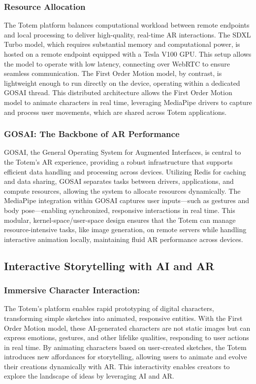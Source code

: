 \subsubsection{Resource Allocation}
The Totem platform balances computational workload between remote endpoints and local processing to deliver high-quality, real-time AR interactions.
The SDXL Turbo model, which requires substantial memory and computational power, is hosted on a remote endpoint equipped with a Tesla V100 GPU.
This setup allows the model to operate with low latency, connecting over WebRTC to ensure seamless communication.
The First Order Motion model, by contrast, is lightweight enough to run directly on the device, operating within a dedicated GOSAI thread.
This distributed architecture allows the First Order Motion model to animate characters in real time, leveraging MediaPipe drivers to capture and process user movements, which are shared across Totem applications.

\subsubsection{GOSAI: The Backbone of AR Performance}
GOSAI, the General Operating System for Augmented Interfaces, is central to the Totem’s AR experience, providing a robust infrastructure that supports efficient data handling and processing across devices.
Utilizing Redis for caching and data sharing, GOSAI separates tasks between drivers, applications, and compute resources, allowing the system to allocate resources dynamically.
The MediaPipe integration within GOSAI captures user inputs—such as gestures and body pose—enabling synchronized, responsive interactions in real time.
This modular, kernel-space/user-space design ensures that the Totem can manage resource-intensive tasks, like image generation, on remote servers while handling interactive animation locally, maintaining fluid AR performance across devices.

\subsection{Interactive Storytelling with AI and AR}
\subsubsection{Immersive Character Interaction:}
The Totem’s platform enables rapid prototyping of digital characters, transforming simple sketches into animated, responsive entities.
With the First Order Motion model, these AI-generated characters are not static images but can express emotions, gestures, and other lifelike qualities, responding to user actions in real time.
By animating characters based on user-created sketches, the Totem introduces new affordances for storytelling, allowing users to animate and evolve their creations dynamically with AR.
This interactivity enables creators to explore the landscape of ideas by leveraging AI and AR.

